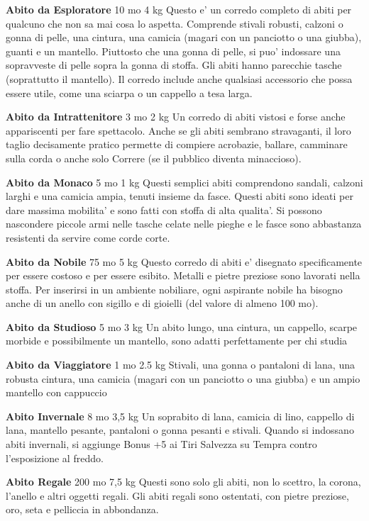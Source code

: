 \documentclass[a4paper,11pt,twoside,openany]{dndbook}
\begin{document}
{\textbf{Abito da Esploratore} 10 mo 4 kg Questo e' un corredo completo di abiti per qualcuno che non sa mai cosa lo aspetta. Comprende stivali robusti, calzoni o gonna di pelle, una cintura, una camicia (magari con un panciotto o una giubba), guanti e un mantello. Piuttosto che una gonna di pelle, si puo' indossare una sopravveste di pelle sopra la gonna di stoffa. Gli abiti hanno parecchie tasche (soprattutto il mantello). Il corredo include anche qualsiasi accessorio che possa essere utile, come una sciarpa o un cappello a tesa larga.

\textbf{Abito da Intrattenitore} 3 mo 2 kg Un corredo di abiti vistosi e forse anche appariscenti per fare spettacolo. Anche se gli abiti sembrano stravaganti, il loro taglio decisamente pratico permette di compiere acrobazie, ballare, camminare sulla corda o anche solo Correre (se il pubblico diventa minaccioso).

\textbf{Abito da Monaco} 5 mo 1 kg Questi semplici abiti comprendono sandali, calzoni larghi e una camicia ampia, tenuti insieme da fasce. Questi abiti sono ideati per dare massima mobilita' e sono fatti con stoffa di alta qualita'. Si possono nascondere piccole armi nelle tasche celate nelle pieghe e le fasce sono abbastanza resistenti da servire come corde corte.

\textbf{Abito da Nobile} 75 mo 5 kg Questo corredo di abiti e' disegnato specificamente per essere costoso e per essere esibito. Metalli e pietre preziose sono lavorati nella stoffa. Per inserirsi in un ambiente nobiliare, ogni aspirante nobile ha bisogno anche di un anello con sigillo e di gioielli (del valore di almeno 100 mo).

\textbf{Abito da Studioso} 5 mo 3 kg Un abito lungo, una cintura, un cappello, scarpe morbide e possibilmente un mantello, sono adatti perfettamente per chi studia

\textbf{Abito da Viaggiatore} 1 mo 2.5 kg Stivali, una gonna o pantaloni di lana, una robusta cintura, una camicia (magari con un panciotto o una giubba) e un ampio mantello con cappuccio

\textbf{Abito Invernale} 8 mo 3,5 kg Un soprabito di lana, camicia di lino, cappello di lana, mantello pesante, pantaloni o gonna pesanti e stivali. Quando si indossano abiti invernali, si aggiunge Bonus +5 ai Tiri Salvezza su Tempra contro l'esposizione al freddo.

\textbf{Abito Regale} 200 mo 7,5 kg Questi sono solo gli abiti, non lo scettro, la corona, l'anello e altri oggetti regali. Gli abiti regali sono ostentati, con pietre preziose, oro, seta e pelliccia in abbondanza.

}
\end{document}
